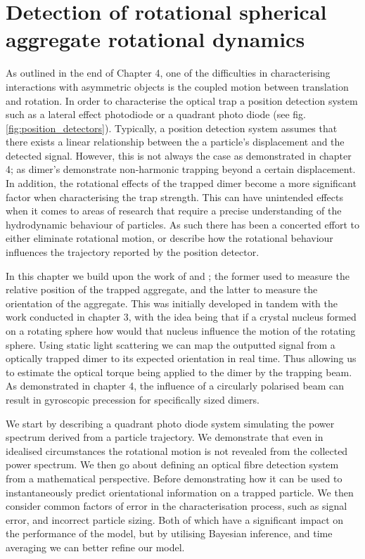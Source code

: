 \chapter{Detection of rotational spherical aggregate rotational dynamics}
\label{chapter:simulated_detection}
As outlined in the end of Chapter 4, one of the difficulties 
in characterising interactions with asymmetric objects is 
the coupled motion between translation and rotation. In order
to characterise the optical trap a position detection system 
such as a lateral effect photodiode or a quadrant photo diode
(see fig.\ref{fig:position_detectors}). Typically, a position 
detection system assumes that there exists a linear relationship 
between the a particle's displacement and the detected signal.
However, this is not always the case as demonstrated in chapter
4; as dimer's demonstrate non-harmonic trapping beyond a certain 
displacement. In addition, the rotational effects of the trapped
dimer become a more significant factor when characterising the 
trap strength. This can have unintended effects when it comes to
areas of research that require a precise understanding of the 
hydrodynamic behaviour of particles. As such there has been a 
concerted effort to either eliminate rotational motion, or describe
how the rotational behaviour influences the trajectory reported 
by the position detector. 

In this chapter we build upon the work of \cite{Rohrbach2002} and
\cite{BarZiv1997}; the former used to measure the relative position
of the trapped aggregate, and the latter to measure the orientation
of the aggregate. This was initially developed in tandem with the 
work conducted in chapter 3, with the idea being that if a crystal 
nucleus formed on a rotating sphere how would that nucleus influence 
the motion of the rotating sphere. Using static light scattering we 
can map the outputted signal from a optically trapped dimer to its 
expected orientation in real time. Thus allowing us to estimate the 
optical torque being applied to the dimer by the trapping beam. As demonstrated in chapter 4, the influence of a circularly polarised 
beam can result in gyroscopic precession for specifically sized 
dimers. 

We start by describing a quadrant photo diode system simulating the 
power spectrum derived from a particle trajectory. We demonstrate 
that even in idealised circumstances the rotational motion is not 
revealed from the collected power spectrum. We then go about 
defining an optical fibre detection system from a mathematical 
perspective. Before demonstrating how it can be used to 
instantaneously predict orientational information on a trapped 
particle. We then consider common factors of error in the 
characterisation process, such as signal error, and incorrect particle 
sizing. Both of which have a significant impact on the performance 
of the model, but by utilising Bayesian inference, and time averaging 
we can better refine our model.   

